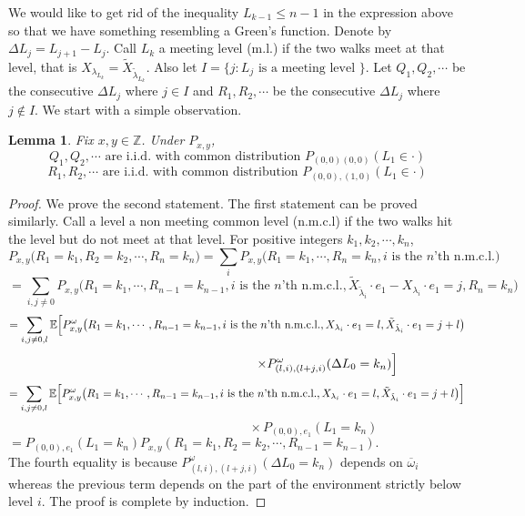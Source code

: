 \documentclass[11pt]{amsart}
\newtheorem{lemma}[theorem]{\sc Lemma}
\begin{document}
We would like to get rid of the inequality $L_{k-1} \le n-1$ in the expression above so that we have something resembling a Green's function. Denote by $\Delta L_j=L_{j+1}-L_j$. Call $L_k$ a meeting level (m.l.) if the two walks meet at that level, that is $X_{\lambda_{L_k}}=\tilde{X}_{\tilde{\lambda}_{L_k}}$. Also let $I=\{j:L_j \mbox{ is a meeting level } \}$. Let $Q_1,Q_2,\cdots $ be the consecutive $\Delta L_j$ where $ j \in I$ and $R_1,R_2,\cdots $ be the consecutive $\Delta L_j$ where $ j \notin I$. We start with a simple observation.

\bigskip

\begin{lemma}
\label{iid}
Fix $x,y \in \mathbb{Z}$. Under $P_{x,y}$,
\[ Q_1,Q_2,\cdots \mbox{ are i.i.d.  with common distribution } P_{(0,0)(0,0)}(L_1 \in \cdot) \]
\[ R_1,R_2, \cdots \mbox{ are i.i.d. with common distribution } P_{(0,0),(1,0)}(L_1 \in \cdot) \]
\end{lemma}
\begin{proof}
 We prove the second statement. The first statement can be proved similarly. Call a level a non meeting common level (n.m.c.l) if the two walks hit the level but do not meet at that level.
For positive integers $k_1,k_2,\cdots,k_n$,
\[P_{x,y}\big(R_1=k_1,R_2=k_2,\cdots, R_n=k_n\big)= \sum_i P_{x,y}\big(R_1=k_1, \cdots, R_{n}=k_{n}, i \mbox{ is the } n \mbox{'th  n.m.c.l.}\big)\]
\[= \sum_{i,j\ne 0} P_{x,y}\big(R_1=k_1, \cdots, R_{n-1}=k_{n-1}, i \mbox{ is the } n \mbox{'th  n.m.c.l.},\tilde{X}_{\tilde{\lambda}_{i}}\cdot e_1-X_{\lambda_{i}}\cdot e_1=j,R_n=k_n\big)\]
\[=\sum_{i,j\ne 0,l} \mathbb{E}\Big{[} P_{x,y}^{\omega}\big(R_1=k_1, \cdots, R_{n-1}=k_{n-1}, i \mbox{ is the } n \mbox{'th  n.m.c.l.},X_{\lambda_{i}}\cdot e_1=l,\tilde{X}_{\tilde{\lambda}_{i}}\cdot e_1=j+l\big)\]
\[\hspace{5cm} \times P_{(l,i),(l+j,i)}^{\omega}(\Delta L_0 = k_n) \Big{]} \]
 \[=\sum_{i,j\ne 0,l} \mathbb{E}\Big{[} P_{x,y}^{\omega}\big(R_1=k_1, \cdots, R_{n-1}=k_{n-1}, i \mbox{ is the } n \mbox{'th  n.m.c.l.},X_{\lambda_{i}}\cdot e_1=l,\tilde{X}_{\tilde{\lambda}_{i}}\cdot e_1=j+l\big) \Big{]} \]
\[\hspace{5cm} \times P_{(0,0),e_1}( L_1 = k_n)  \]
 \[= P_{(0,0),e_1}(L_1=k_n)P_{x,y}(R_1=k_1,R_2=k_2,\cdots,R_{n-1}=k_{n-1}).\hspace{5cm} \]
The fourth equality is because $P^{\omega}_{(l,i),(l+j,i)}(\Delta L_0=k_n)$ depends on $\overline{\omega}_i$ whereas the previous term depends on the part of the environment strictly below level $i$. The proof is complete by induction.
\end{proof}
\end{document}
